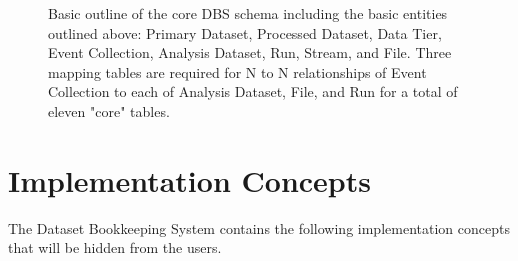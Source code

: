\documentclass{cmspaper}
\begin{document}
\begin{figure}[hbtp]
  \begin{center}
    \caption{Basic outline of the core DBS schema including the basic entities outlined 
above: Primary Dataset, Processed Dataset, Data Tier, Event Collection, Analysis Dataset, Run, 
Stream, and File.  Three mapping tables are required for N to N relationships of 
Event Collection to each of Analysis Dataset, File, and Run for a total of eleven "core" tables. }
    \label{fig:highlevel}
  \end{center}
\end{figure}

\section{Implementation Concepts}

The Dataset Bookkeeping System contains the following implementation concepts 
that will be hidden from the users.  
\end{document}
